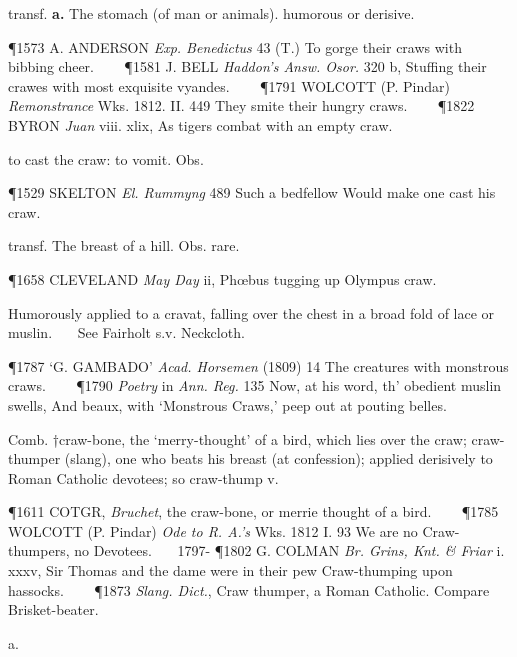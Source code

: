 \begin{description}[wide, labelwidth=!, labelindent=0pt]
\begin{myenumerate}
 transf. \textbf{a.} The stomach (of man or animals). humorous or derisive.

\P 1573 A. ANDERSON  \textit{Exp. Benedictus} 43 (T.) To gorge their craws with bibbing cheer.    
\P 1581 J. BELL  \textit{Haddon's Answ. Osor.} 320 b, Stuffing their crawes with most exquisite vyandes.    
\P 1791 WOLCOTT  (P. Pindar) \textit{Remonstrance} Wks. 1812. II. 449 They smite their hungry craws.    
\P 1822 BYRON  \textit{Juan} viii. xlix, As tigers combat with an empty craw.

 to cast the craw: to vomit. Obs.

\P 1529 SKELTON  \textit{El. Rummyng} 489 Such a bedfellow Would make one cast his craw.

 transf. The breast of a hill. Obs. rare.

\P 1658 CLEVELAND  \textit{May Day} ii, Phœbus tugging up Olympus craw.

 Humorously applied to a cravat, falling over the chest in a broad fold of lace or muslin.
   See Fairholt s.v. Neckcloth.

\P 1787 ‘G.  GAMBADO’ \textit{Acad. Horsemen} (1809) 14 The creatures with monstrous craws.    
\P 1790  \textit{Poetry} in \textit{Ann. Reg.} 135 Now, at his word, th' obedient muslin swells, And beaux, with ‘Monstrous Craws,’ peep out at pouting belles.

 Comb. †craw-bone, the ‘merry-thought’ of a bird, which lies over the craw; craw-thumper (slang), one who beats his breast (at confession); applied derisively to Roman Catholic devotees; so craw-thump v.

\P 1611 COTGR,  \textit{Bruchet}, the craw-bone, or merrie thought of a bird.    
\P 1785 WOLCOTT  (P. Pindar) \textit{Ode to R. A.'s} Wks. 1812 I. 93 We  are no Craw-thumpers, no Devotees.    1797-
\P 1802 G. COLMAN  \textit{Br. Grins, Knt. \& Friar} i. xxxv, Sir Thomas and the dame were in their pew Craw-thumping upon hassocks.    
\P 1873 \textit{Slang.  Dict.}, Craw thumper, a Roman Catholic. Compare Brisket-beater.
\end{myenumerate}


 a.

\noindent {}

\vspace{-0.3cm}


\end{description}
